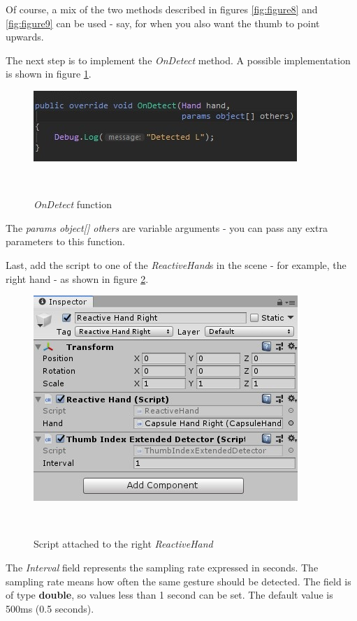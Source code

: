 \documentclass[chi_draft]{sigchi}
\begin{document}
Of course, a mix of the two methods described in figures \ref{fig:figure8} and \ref{fig:figure9} can be used - say, for when you also want the thumb to point upwards.


The next step is to implement the \textit{OnDetect} method. A possible implementation is shown in figure \ref{fig:figure10}.

\begin{figure}[h]
  \centering
  \includegraphics[width=0.9\columnwidth]{figures/FluentMotion_onDetect}
  \caption{\textit{OnDetect} function}~\label{fig:figure10}
\end{figure}

The \textit{params object[] others} are variable arguments - you can pass any extra parameters to this function.


Last, add the script to one of the \textit{ReactiveHand}s in the scene - for example, the right hand - as shown in figure \ref{fig:figure11}. 

\begin{figure}[h]
  \centering
  \includegraphics[width=0.9\columnwidth]{figures/FluentMotion_script_attached}
  \caption{Script attached to the right \textit{ReactiveHand}}~\label{fig:figure11}
\end{figure}

The \textit{Interval} field represents the sampling rate expressed in seconds. The sampling rate means how often the same gesture should be detected. The field is of type \textbf{double}, so values less than 1 second can be set. The default value is 500ms (0.5 seconds).
\end{document}
